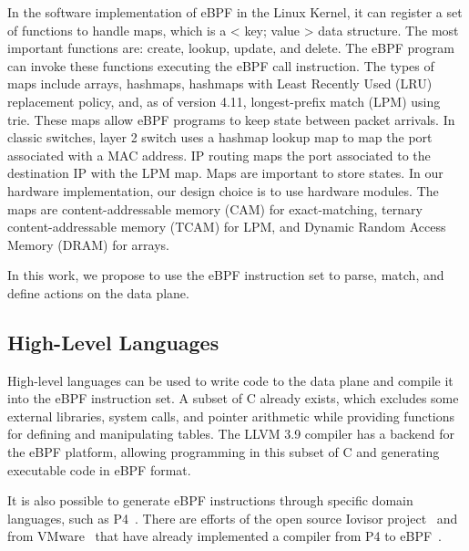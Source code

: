 

In the software implementation of eBPF in the Linux Kernel, it can register a set of functions to handle maps, which is a < key; value > data structure. 
The most important functions are: create, lookup, update, and delete.
The eBPF program can invoke these functions executing the eBPF call instruction.
The types of maps include arrays, hashmaps, hashmaps with Least Recently Used (LRU) replacement policy, and, as of version 4.11, longest-prefix match (LPM) using trie.
These maps allow eBPF programs to keep state between packet arrivals.
In classic switches, layer 2 switch uses a hashmap lookup map to map the port associated with a MAC address.
IP routing maps the port associated to the destination IP with the LPM map.
Maps are important to store states.
In our hardware implementation, our design choice is to use hardware modules. The maps are content-addressable memory (CAM) for exact-matching, ternary content-addressable memory (TCAM) for LPM, and Dynamic Random Access Memory (DRAM) for arrays.


In this work, we propose to use the eBPF instruction set to parse, match, and define actions on the data plane.

\subsection{High-Level Languages}


High-level languages can be used to write code to the data plane and compile it into the eBPF instruction set. A subset of C already exists, which excludes some external libraries, system calls, and pointer arithmetic while providing functions for defining and manipulating tables. The LLVM 3.9 compiler has a backend for the eBPF platform, allowing programming in this subset of C and generating executable code in eBPF format.

It is also possible to generate eBPF instructions through specific domain languages, such as P4~\cite{Bosshart:2014:P4}.
There are efforts of the open source Iovisor project~\cite{IOvisor} and from VMware~\cite{p4c-xdp2018} that have already implemented a compiler from P4 to eBPF~\cite{P42EBPF2015}.


